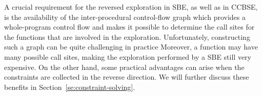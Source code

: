 {%

A crucial requirement for the reversed exploration in SBE, as well as in CCBSE, is the availability of the inter-procedural control-flow graph which provides a whole-program control flow and makes it possible to determine the call sites for the functions that are involved in the exploration. Unfortunately, constructing such a graph can be quite challenging in practice Moreover, a function may have many possible call sites, making the exploration performed by a SBE still very expensive. On the other hand, some practical advantages can arise when the constraints are collected in the reverse direction. We will further discuss these benefits in Section~\ref{se:constraint-solving}.  

}

